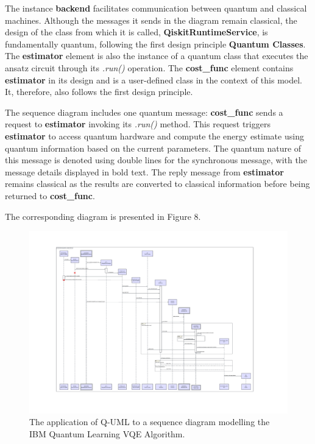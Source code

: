 \documentclass{article}
\begin{document}
The instance \textbf{backend} facilitates communication between quantum and classical machines. Although the messages it sends in the diagram remain classical, the design of the class from which it is called, \textbf{QiskitRuntimeService}, is fundamentally quantum, following the first design principle \textbf{Quantum Classes}. The \textbf{estimator} element is also the instance of a quantum class that executes the ansatz circuit through its \textit{.run()} operation. The \textbf{cost\_func} element contains \textbf{estimator} in its design and is a user-defined class in the context of this model. It, therefore, also follows the first design principle. 

The sequence diagram includes one quantum message: \textbf{cost\_func} sends a request to \textbf{estimator} invoking its \textit{.run()} method. This request triggers \textbf{estimator} to access quantum hardware and compute the energy estimate using quantum information based on the current parameters. The quantum nature of this message is denoted using double lines for the synchronous message, with the message details displayed in bold text. The reply message from \textbf{estimator} remains classical as the results are converted to classical information before being returned to \textbf{cost\_func}.

The corresponding diagram is presented in Figure 8.

\begin{figure}
    \centering
    \includegraphics[width=1\linewidth]{VQE QUML SD Final Version.pdf}
    \caption{The application of Q-UML to a sequence diagram modelling the IBM Quantum Learning VQE Algorithm.}
    \label{fig:Q-UML_SD}
\end{figure}
\end{document}
